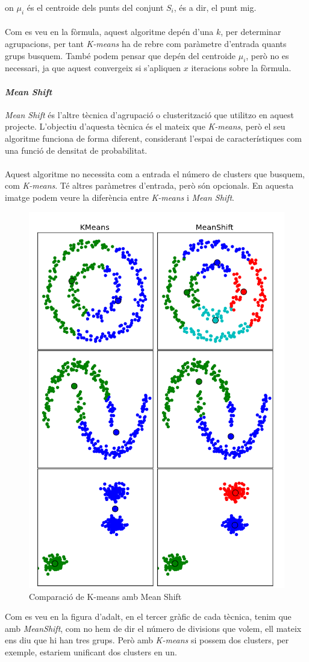 \documentclass[12pt,a4paper,catalan]{article}
\begin{document}
on $\mu_i$ és el centroide dels punts del conjunt $S_i$, és a dir, el punt mig.
\\
\\
Com es veu en la fòrmula, aquest algoritme depén d'una $k$, per determinar agrupacions, per tant \textit{K-means} ha de rebre com paràmetre d'entrada quants grups busquem. També podem pensar que depén del centroide $\mu_i$, però no es necessari, ja que aquest convergeix si s'apliquen $x$ iteracions sobre la fòrmula.

\newpage

\paragraph{\textit{Mean Shift}}
\textit{Mean Shift} \cite{mean-shift} és l'altre tècnica d'agrupació o clusterització que utilitzo en aquest projecte. L'objectiu d'aquesta tècnica és el mateix que \textit{K-means}, però el seu algoritme funciona de forma diferent, considerant l'espai de característiques com una funció de densitat de probabilitat.
\\
\\
Aquest algoritme no necessita com a entrada el número de clusters que busquem, com \textit{K-means}. Té altres paràmetres d'entrada, però són opcionals. En aquesta imatge podem veure la diferència entre \textit{K-means} i \textit{Mean Shift}.

\begin{figure}[h]
\centering
\includegraphics[width=.4\linewidth]{img/kmeansVsMeanshift.png}
\caption{Comparació de K-means amb Mean Shift \cite{comp-meanshift-kmeans}}
\end{figure}

Com es veu en la figura d'adalt, en el tercer gràfic de cada tècnica, tenim que amb \textit{MeanShift}, com no hem de dir el número de divisions que volem, ell mateix ens diu que hi han tres grups. Però amb \textit{K-means} si possem dos clusters, per exemple, estariem unificant dos clusters en un.
\end{document}
